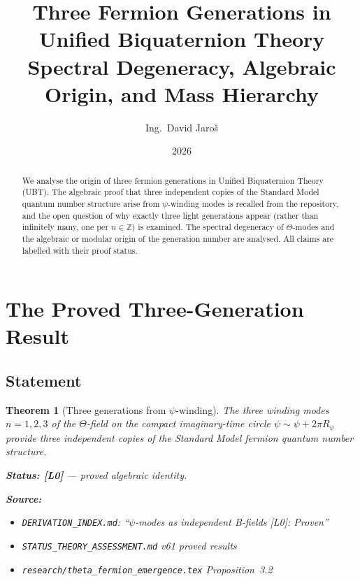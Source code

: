 \documentclass[11pt,a4paper]{article}
\title{Three Fermion Generations in Unified Biquaternion Theory\\
\large Spectral Degeneracy, Algebraic Origin, and Mass Hierarchy}
\author{Ing.\ David Jaroš}
\date{2026}
\newtheorem{theorem}{Theorem}
\begin{document}
\maketitle

\begin{abstract}
We analyse the origin of three fermion generations in Unified Biquaternion
Theory (UBT).  The algebraic proof that three independent copies of the
Standard Model quantum number structure arise from $\psi$-winding modes
is recalled from the repository, and the open question of why exactly
three light generations appear (rather than infinitely many, one per
$n \in \mathbb{Z}$) is examined.  The spectral degeneracy of $\Theta$-modes
and the algebraic or modular origin of the generation number are analysed.
All claims are labelled with their proof status.
\end{abstract}

\tableofcontents

\section{The Proved Three-Generation Result}
\label{sec:three_gen_proof}

\subsection{Statement}

\begin{theorem}[Three generations from $\psi$-winding]\label{thm:three_gen}
  The three winding modes $n = 1, 2, 3$ of the $\Theta$-field on the compact
  imaginary-time circle $\psi \sim \psi + 2\pi R_\psi$ provide three
  independent copies of the Standard Model fermion quantum number structure.

  \textbf{Status: [L0]} — proved algebraic identity.

  \textbf{Source:}
  \begin{itemize}
    \item \texttt{DERIVATION\_INDEX.md}: ``$\psi$-modes as independent
      B-fields [L0]: Proven''
    \item \texttt{STATUS\_THEORY\_ASSESSMENT.md} v61 proved results
    \item \texttt{research/theta\_fermion\_emergence.tex} Proposition~3.2
  \end{itemize}
\end{theorem}
\end{document}
